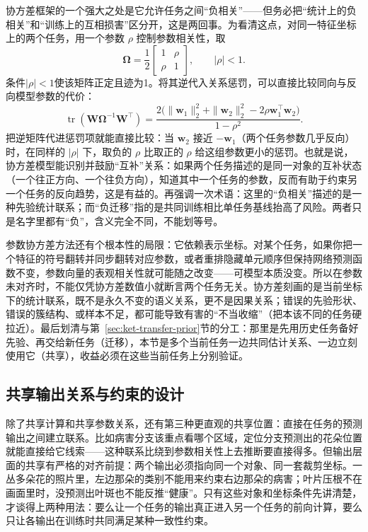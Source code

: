 协方差框架的一个强大之处是它允许任务之间“负相关”——但务必把“统计上的负相关”和“训练上的互相损害”区分开，这是两回事。为看清这点，对同一特征坐标上的两个任务，用一个参数 $\rho$ 控制参数相关性，取
\begin{equation}
  \bm\Omega=\frac12
  \begin{bmatrix}1&\rho\\\rho&1\end{bmatrix},
  \qquad |\rho|<1.
\end{equation}
条件$|\rho|<1$使该矩阵正定且迹为1。将其逆代入关系惩罚，可以直接比较同向与反向模型参数的代价：
\begin{equation}
  \operatorname{tr}(\bm W\bm\Omega^{-1}\bm W^{\top})
  =
  \frac{2\bigl(\|\bm w_1\|_2^2+\|\bm w_2\|_2^2
  -2\rho\bm w_1^{\top}\bm w_2\bigr)}
  {1-\rho^2}.
  \label{eq:ket-sharing-negative-correlation}
\end{equation}
把逆矩阵代进惩罚项就能直接比较：当 $\bm w_2$ 接近 $-\bm w_1$（两个任务参数几乎反向）时，在同样的 $|\rho|$ 下，取负的 $\rho$ 比取正的 $\rho$ 给这组参数更小的惩罚。也就是说，协方差模型能识别并鼓励“互补”关系：如果两个任务描述的是同一对象的互补状态（一个往正方向、一个往负方向），知道其中一个任务的参数，反而有助于约束另一个任务的反向趋势，这是有益的。再强调一次术语：这里的“负相关”描述的是一种先验统计联系；而“负迁移”指的是共同训练相比单任务基线抬高了风险。两者只是名字里都有“负”，含义完全不同，不能划等号。

参数协方差方法还有个根本性的局限：它依赖表示坐标。对某个任务，如果你把一个特征的符号翻转并同步翻转对应参数，或者重排隐藏单元顺序但保持网络预测函数不变，参数向量的表观相关性就可能随之改变——可模型本质没变。所以在参数未对齐时，不能仅凭协方差数值小就断言两个任务无关。协方差刻画的是当前坐标下的统计联系，既不是永久不变的语义关系，更不是因果关系；错误的先验形状、错误的簇结构、或样本不足，都可能导致有害的“不当收缩”（把本该不同的任务硬拉近）。最后划清与第~\ref{sec:ket-transfer-prior}节的分工：那里是先用历史任务备好先验、再交给新任务（迁移），本节是多个当前任务一边共同估计关系、一边立刻使用它（共享），收益必须在这些当前任务上分别验证。

\subsection{共享输出关系与约束的设计}
\label{sec:ket-sharing-outputs}

除了共享计算和共享参数关系，还有第三种更直观的共享位置：直接在任务的预测输出之间建立联系。比如病害分支该重点看哪个区域，定位分支预测出的花朵位置就能直接给它线索——这种联系比绕到参数相关性上去推断要直接得多。但输出层面的共享有严格的对齐前提：两个输出必须指向同一个对象、同一套裁剪坐标。一丛多朵花的照片里，左边那朵的类别不能用来约束右边那朵的病害；叶片压根不在画面里时，没预测出叶斑也不能反推“健康”。只有这些对象和坐标条件先讲清楚，才谈得上两种用法：要么让一个任务的输出真正进入另一个任务的前向计算，要么只让各输出在训练时共同满足某种一致性约束。

